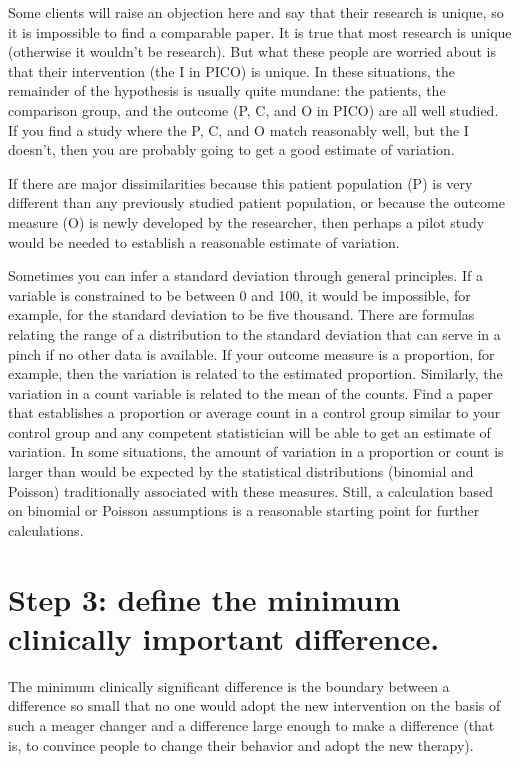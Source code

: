 \documentclass[
  letterpaper,
  DIV=11,
  numbers=noendperiod]{scrreprt}
\begin{document}
Some clients will raise an objection here and say that their research is
unique, so it is impossible to find a comparable paper. It is true that
most research is unique (otherwise it wouldn't be research). But what
these people are worried about is that their intervention (the I in
PICO) is unique. In these situations, the remainder of the hypothesis is
usually quite mundane: the patients, the comparison group, and the
outcome (P, C, and O in PICO) are all well studied. If you find a study
where the P, C, and O match reasonably well, but the I doesn't, then you
are probably going to get a good estimate of variation.

If there are major dissimilarities because this patient population (P)
is very different than any previously studied patient population, or
because the outcome measure (O) is newly developed by the researcher,
then perhaps a pilot study would be needed to establish a reasonable
estimate of variation.

Sometimes you can infer a standard deviation through general principles.
If a variable is constrained to be between 0 and 100, it would be
impossible, for example, for the standard deviation to be five thousand.
There are formulas relating the range of a distribution to the standard
deviation that can serve in a pinch if no other data is available. If
your outcome measure is a proportion, for example, then the variation is
related to the estimated proportion. Similarly, the variation in a count
variable is related to the mean of the counts. Find a paper that
establishes a proportion or average count in a control group similar to
your control group and any competent statistician will be able to get an
estimate of variation. In some situations, the amount of variation in a
proportion or count is larger than would be expected by the statistical
distributions (binomial and Poisson) traditionally associated with these
measures. Still, a calculation based on binomial or Poisson assumptions
is a reasonable starting point for further calculations.

\hypertarget{step-3-define-the-minimum-clinically-important-difference.}{%
\section{Step 3: define the minimum clinically important
difference.}\label{step-3-define-the-minimum-clinically-important-difference.}}

The minimum clinically significant difference is the boundary between a
difference so small that no one would adopt the new intervention on the
basis of such a meager changer and a difference large enough to make a
difference (that is, to convince people to change their behavior and
adopt the new therapy).
\end{document}
